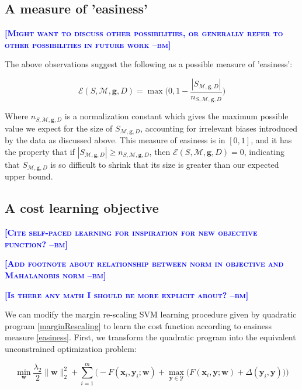 \documentclass{article} %
\newcommand{\bmcomment}[1]{\textcolor{blue}{\textsc{\textbf{[#1 --bm]}}}}
\begin{document}
\subsection{A measure of 'easiness'}

\bmcomment{Might want to discuss other possibilities, or generally
refer to other possibilities in future work}

The above observations suggest the following as a possible 
measure of 'easiness':

\begin{equation}
\label{easiness}
\mathcal{E}(S,\mathcal{M},\mathbf{g},D)=\max\bigg(0, 1-\frac{|S_{\mathcal{M},\mathbf{g},D}|}{n_{S,\mathcal{M},\mathbf{g},D}}\bigg)
\end{equation}

Where $n_{S,\mathcal{M},\mathbf{g},D}$ is a normalization constant which
gives the maximum possible value we expect for the size of 
$S_{\mathcal{M},\mathbf{g},D}$, accounting for irrelevant biases
introduced by the data as discussed above.  This measure of easiness 
is in $[0,1]$, and it has the property that if 
$|S_{\mathcal{M},\mathbf{g},D}|\geq n_{S,\mathcal{M},\mathbf{g},D}$,
then $\mathcal{E}(S,\mathcal{M},\mathbf{g},D)=0$, indicating that
$S_{\mathcal{M},\mathbf{g},D}$ is so difficult to shrink that its
size is greater than our expected upper bound.

\subsection{A cost learning objective}

\bmcomment{Cite self-paced learning for inspiration for new objective function?}

\bmcomment{Add footnote about relationship between norm in objective and
Mahalanobis norm}

\bmcomment{Is there any math I should be more explicit about?}

We can modify the margin re-scaling SVM learning procedure given by 
quadratic program \ref{marginRescaling} to learn the cost function 
according to easiness measure \ref{easiness}.
First, we transform the quadratic program
into the equivalent unconstrained optimization problem:

\begin{equation}
\label{svmObjective}
\min_{\mathbf{w}} \frac{\lambda_2}{2}\|\mathbf{w}\|_2^2 + \sum_{i=1}^m\bigg(-F(\mathbf{x}_i,\mathbf{y}_i;\mathbf{w})+\max_{\mathbf{y}\in \mathcal{Y}}\Big(F(\mathbf{x}_i,\mathbf{y};\mathbf{w})+\Delta(\mathbf{y}_i,\mathbf{y})\Big)\bigg)
\end{equation}
\end{document}
